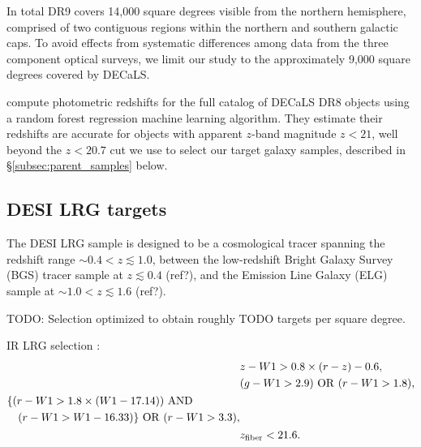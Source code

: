 \documentclass[twocolumn,apj,iop,tighten]{emulateapj2}
\begin{document}
In total DR9 covers 14,000 square degrees visible from the northern hemisphere, comprised of two contiguous regions within the northern and southern galactic caps. To avoid effects from systematic differences among data from the three component optical surveys, we limit our study to the approximately 9,000 square degrees covered by DECaLS.

\citet{zhou_etal20b} compute photometric redshifts for the full catalog of DECaLS DR8 objects using a random forest regression machine learning algorithm. They estimate their redshifts are accurate for objects with apparent $z$-band magnitude $z < 21$, well beyond the $z<20.7$ cut we use to select our target galaxy samples, described in \S\ref{subsec:parent_samples} below.


\subsection{DESI LRG targets}\label{subsec:lrg}

The DESI LRG sample is designed to be a cosmological tracer spanning the redshift range $\sim0.4 < z \lesssim 1.0$, between the low-redshift Bright Galaxy Survey (BGS) tracer sample at $z\lesssim0.4$ (ref?), and the Emission Line Galaxy (ELG) sample at  $\sim1.0 < z \lesssim 1.6$ (ref?).

TODO: Selection optimized to obtain roughly TODO targets per square degree.

IR LRG selection \citep{zhou_etal20b}:
\begin{subequations}\label{eq:lrg_ir}
  \begin{align}
   & z - W1 > 0.8 \times (r - z) - 0.6, \\
   & ( g - W1 > 2.9)\ {\rm OR}\ (r - W1 > 1.8), \\
   \begin{split}
   & \{ ( r - W1 > 1.8 \times (W1 - 17.14) )\ {\rm AND} \\
   & \phantom{00} ( r - W1 > W1 - 16.33 ) \}\ {\rm OR}\ ( r - W1 > 3.3 ),
  \end{split} \\
   & z_{\rm fiber} < 21.6.
  \end{align}
\end{subequations}
\end{document}
